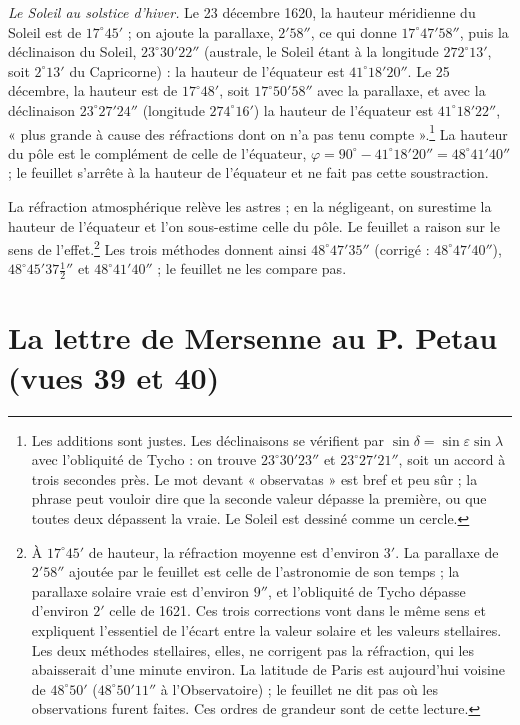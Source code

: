 \documentclass[11pt,a4paper]{article}
\begin{document}
\emph{Le Soleil au solstice d'hiver.} Le 23 décembre 1620, la hauteur méridienne
du Soleil est de $17^\circ 45'$ ; on ajoute la parallaxe, $2' 58''$, ce qui
donne $17^\circ 47' 58''$, puis la déclinaison du Soleil, $23^\circ 30' 22''$
(australe, le Soleil étant à la longitude $272^\circ 13'$, soit $2^\circ 13'$
du Capricorne) : la hauteur de l'équateur est $41^\circ 18' 20''$. Le 25
décembre, la hauteur est de $17^\circ 48'$, soit $17^\circ 50' 58''$ avec la
parallaxe, et avec la déclinaison $23^\circ 27' 24''$ (longitude
$274^\circ 16'$) la hauteur de l'équateur est $41^\circ 18' 22''$, « plus
grande à cause des réfractions dont on n'a pas tenu compte ».\footnote{Les
additions sont justes. Les déclinaisons se vérifient par $\sin\delta =
\sin\varepsilon \sin\lambda$ avec l'obliquité de Tycho : on trouve
$23^\circ 30' 23''$ et $23^\circ 27' 21''$, soit un accord à trois secondes
près. Le mot devant « observatas » est bref et peu sûr ; la phrase peut
vouloir dire que la seconde valeur dépasse la première, ou que toutes deux
dépassent la vraie. Le Soleil est dessiné comme un cercle.} La hauteur du
pôle est le complément de celle de l'équateur,
$\varphi = 90^\circ - 41^\circ 18' 20'' = 48^\circ 41' 40''$ ; le feuillet
s'arrête à la hauteur de l'équateur et ne fait pas cette soustraction.

La réfraction atmosphérique relève les astres ; en la négligeant, on
surestime la hauteur de l'équateur et l'on sous-estime celle du pôle. Le
feuillet a raison sur le sens de l'effet.\footnote{À $17^\circ 45'$ de hauteur,
la réfraction moyenne est d'environ $3'$. La parallaxe de $2' 58''$ ajoutée
par le feuillet est celle de l'astronomie de son temps ; la parallaxe solaire
vraie est d'environ $9''$, et l'obliquité de Tycho dépasse d'environ $2'$ celle
de 1621. Ces trois corrections vont dans le même sens et expliquent l'essentiel
de l'écart entre la valeur solaire et les valeurs stellaires. Les deux
méthodes stellaires, elles, ne corrigent pas la réfraction, qui les abaisserait
d'une minute environ. La latitude de Paris est aujourd'hui voisine de
$48^\circ 50'$ ($48^\circ 50' 11''$ à l'Observatoire) ; le feuillet ne dit pas
où les observations furent faites. Ces ordres de grandeur sont de cette
lecture.} Les trois méthodes donnent ainsi $48^\circ 47' 35''$ (corrigé :
$48^\circ 47' 40''$), $48^\circ 45' 37\tfrac12''$ et $48^\circ 41' 40''$ ; le
feuillet ne les compare pas.

\section*{La lettre de Mersenne au P. Petau (vues 39 et 40)}
\end{document}
